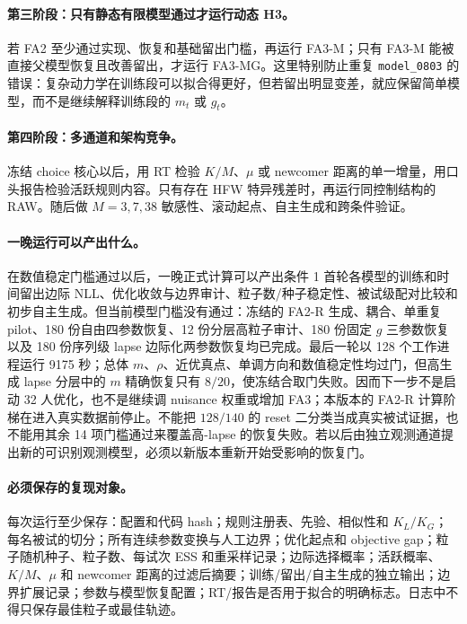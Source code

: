 \paragraph{第三阶段：只有静态有限模型通过才运行动态 H3。}
若 FA2 至少通过实现、恢复和基础留出门槛，再运行 FA3-M；只有 FA3-M 能被直接父模型恢复且改善留出，才运行 FA3-MG。这里特别防止重复 \texttt{model\_0803} 的错误：复杂动力学在训练段可以拟合得更好，但若留出明显变差，就应保留简单模型，而不是继续解释训练段的 $m_t$ 或 $g_t$。

\paragraph{第四阶段：多通道和架构竞争。}
冻结 choice 核心以后，用 RT 检验 $K/M$、$\mu$ 或 newcomer 距离的单一增量，用口头报告检验活跃规则内容。只有存在 HFW 特异残差时，再运行同控制结构的 RAW。随后做 $M=3,7,38$ 敏感性、滚动起点、自主生成和跨条件验证。

\paragraph{一晚运行可以产出什么。}
在数值稳定门槛通过以后，一晚正式计算可以产出条件 1 首轮各模型的训练和时间留出边际 NLL、优化收敛与边界审计、粒子数/种子稳定性、被试级配对比较和初步自主生成。但当前模型门槛没有通过：冻结的 FA2-R 生成、耦合、单重复 pilot、180 份自由四参数恢复、12 份分层高粒子审计、180 份固定 $g$ 三参数恢复以及 180 份序列级 lapse 边际化两参数恢复均已完成。最后一轮以 128 个工作进程运行 9175 秒；总体 $m$、$\rho$、近优真点、单调方向和数值稳定性均过门，但高生成 lapse 分层中的 $m$ 精确恢复只有 $8/20$，使冻结合取门失败。因而下一步不是启动 32 人优化，也不是继续调 nuisance 权重或增加 FA3；本版本的 FA2-R 计算阶梯在进入真实数据前停止。不能把 $128/140$ 的 reset 二分类当成真实被试证据，也不能用其余 14 项门槛通过来覆盖高-lapse 的恢复失败。若以后由独立观测通道提出新的可识别观测模型，必须以新版本重新开始受影响的恢复门。

\paragraph{必须保存的复现对象。}
每次运行至少保存：配置和代码 hash；规则注册表、先验、相似性和 $K_L/K_G$；每名被试的切分；所有连续参数变换与人工边界；优化起点和 objective gap；粒子随机种子、粒子数、每试次 ESS 和重采样记录；边际选择概率；活跃概率、$K/M$、$\mu$ 和 newcomer 距离的过滤后摘要；训练/留出/自主生成的独立输出；边界扩展记录；参数与模型恢复配置；RT/报告是否用于拟合的明确标志。日志中不得只保存最佳粒子或最佳轨迹。


